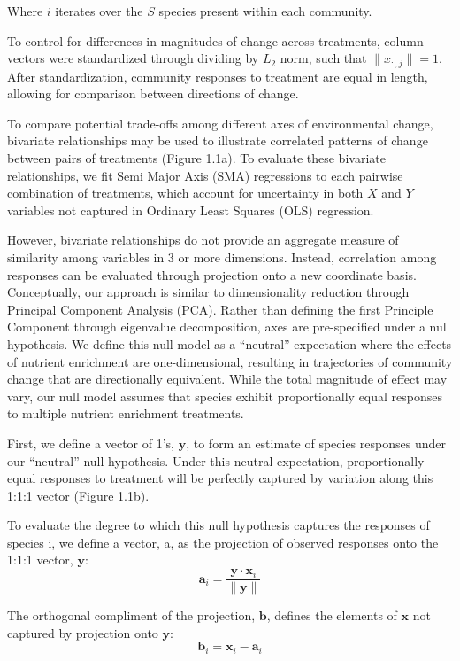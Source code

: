 \documentclass[twoside,12pt,final]{ucthesis-CA2012}
\begin{document}
\begin{ucmainmatter}
Where \(i\) iterates over the \(S\) species present within each community.

To control for differences in magnitudes of change across treatments, column vectors were standardized through dividing by \(L_2\) norm, such that \(\|x_{:,j}\| = 1\). After standardization, community responses to treatment are equal in length, allowing for comparison between directions of change.

To compare potential trade-offs among different axes of environmental change, bivariate relationships may be used to illustrate correlated patterns of change between pairs of treatments (Figure 1.1a). To evaluate these bivariate relationships, we fit Semi Major Axis (SMA) regressions to each pairwise combination of treatments, which account for uncertainty in both \(X\) and \(Y\) variables not captured in Ordinary Least Squares (OLS) regression.

However, bivariate relationships do not provide an aggregate measure of similarity among variables in 3 or more dimensions. Instead, correlation among responses can be evaluated through projection onto a new coordinate basis. Conceptually, our approach is similar to dimensionality reduction through Principal Component Analysis (PCA). Rather than defining the first Principle Component through eigenvalue decomposition, axes are pre-specified under a null hypothesis. We define this null model as a ``neutral'' expectation where the effects of nutrient enrichment are one-dimensional, resulting in trajectories of community change that are directionally equivalent. While the total magnitude of effect may vary, our null model assumes that species exhibit proportionally equal responses to multiple nutrient enrichment treatments.

First, we define a vector of 1's, \(\mathbf{y}\), to form an estimate of species responses under our ``neutral'' null hypothesis. Under this neutral expectation, proportionally equal responses to treatment will be perfectly captured by variation along this 1:1:1 vector (Figure 1.1b).

To evaluate the degree to which this null hypothesis captures the responses of species i, we define a vector, a, as the projection of observed responses onto the 1:1:1 vector, \(\mathbf{y}\):
\[\mathbf{a}_i = \frac{\mathbf{y} \cdot \mathbf{x}_i}{\|\mathbf{y}\|}\]

The orthogonal compliment of the projection, \(\mathbf{b}\), defines the elements of \(\mathbf{x}\) not captured by projection onto \(\mathbf{y}\):
\[\mathbf{b}_i = \mathbf{x}_i - \mathbf{a}_i\]


\end{ucmainmatter}
\end{document}
